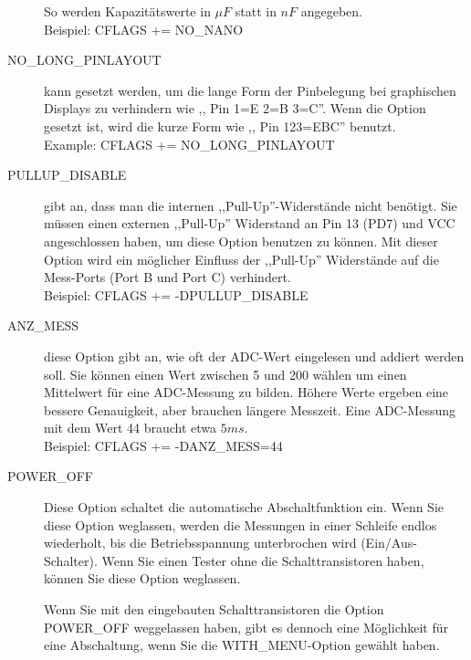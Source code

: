 \begin{description}
So werden Kapazitätswerte in \(\mu F\) statt in \(nF\) angegeben.\\
Beispiel: CFLAGS += NO\_NANO
  \item[NO\_LONG\_PINLAYOUT] kann gesetzt werden, um die lange Form der Pinbelegung bei graphischen Displays zu verhindern
 wie ,, Pin  1=E 2=B 3=C''.
Wenn die Option gesetzt ist, wird die kurze Form wie ,, Pin  123=EBC'' benutzt.\\
Example: CFLAGS += NO\_LONG\_PINLAYOUT
  \item[PULLUP\_DISABLE] gibt an, dass man die internen ,,Pull-Up''-Widerstände nicht benötigt.
 Sie müssen einen externen ,,Pull-Up'' Widerstand an Pin 13 (PD7) und VCC angeschlossen haben, um diese
Option benutzen zu können.
Mit dieser Option wird ein möglicher Einfluss der ,,Pull-Up'' Widerstände auf die Mess-Ports (Port B und Port C) verhindert.\\
Beispiel: CFLAGS += -DPULLUP\_DISABLE

  \item[ANZ\_MESS] diese Option gibt an, wie oft der ADC-Wert eingelesen und addiert werden soll.
Sie können einen Wert zwischen 5 und 200 wählen um einen Mittelwert für eine ADC-Messung zu bilden.
Höhere Werte ergeben eine bessere Genauigkeit, aber brauchen längere Messzeit.
Eine ADC-Messung mit dem Wert 44 braucht etwa \(5ms\).\\
Beispiel: CFLAGS += -DANZ\_MESS=44

  \item[POWER\_OFF] Diese Option schaltet die automatische Abschaltfunktion ein.
Wenn Sie diese Option weglassen, werden die Messungen in einer Schleife endlos wiederholt, bis die Betriebsspannung 
unterbrochen wird (Ein/Aus-Schalter).
Wenn Sie einen Tester ohne die Schalttransistoren haben, können Sie diese Option weglassen.

Wenn Sie mit den eingebauten Schalttransistoren die Option POWER\_OFF weggelassen haben,
gibt es dennoch eine Möglichkeit für eine Abschaltung, wenn Sie die WITH\_MENU-Option gewählt haben.


\end{description}
